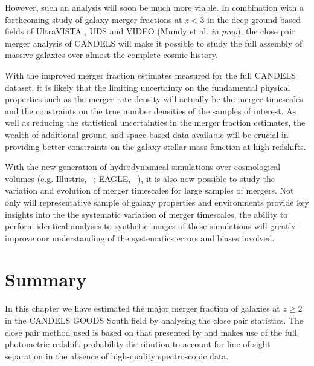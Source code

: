 However, such an analysis will soon be much more viable. In combination with a forthcoming study of galaxy merger fractions at $z < 3$ in the deep ground-based fields of UltraVISTA \citep{McCracken:2012gd}, UDS \citep{Lawrence:2007hu} and VIDEO \citep{Jarvis:2012hr} (Mundy et al. \emph{in prep}), the close pair merger analysis of CANDELS will make it possible to study the full assembly of massive galaxies over almost the complete cosmic history.

With the improved merger fraction estimates measured for the full CANDELS dataset, it is likely that the limiting uncertainty on the fundamental physical properties such as the merger rate density will actually be the merger timescales and the constraints on the true number densities of the samples of interest. As well as reducing the statistical uncertainties in the merger fraction estimates, the wealth of additional ground and space-based data available will be crucial in providing better constraints on the galaxy stellar mass function at high redshifts. 

With the new generation of hydrodynamical simulations over cosmological volumes (e.g. Illustris, \citeauthor{Vogelsberger:2014gw}~\citeyear{Vogelsberger:2014gw}; EAGLE, \citeauthor{Schaye:2014gk}~\citeyear{Schaye:2014gk}), it is also now possible to study the variation and evolution of merger timescales for large samples of mergers. Not only will representative sample of galaxy properties and environments provide key insights into the the systematic variation of merger timescales, the ability to perform identical analyses to synthetic images of these simulations \citep{Torrey:2015kx} will greatly improve our understanding of the systematics errors and biases involved.

\section{Summary}\label{sec:summary}
In this chapter we have estimated the major merger fraction of galaxies at $z\geq 2$ in the CANDELS GOODS South field \citep{Guo:2013ig} by analysing the close pair statistics. The close pair method used is based on that presented by \citet{LopezSanjuan:2014uj} and makes use of the full photometric redshift probability distribution to account for line-of-sight separation in the absence of high-quality spectroscopic data.

